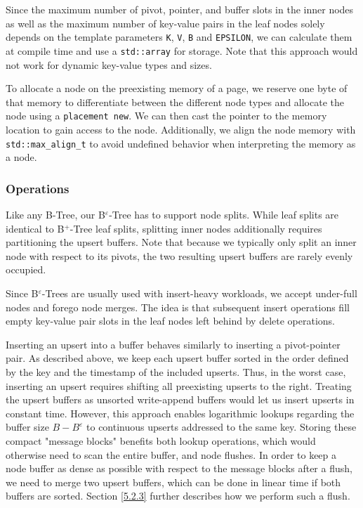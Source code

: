 Since the maximum number of pivot, pointer, and buffer slots in the inner nodes as well as the maximum number of key-value pairs in the leaf nodes solely depends on the template parameters \texttt{K}, \texttt{V}, \texttt{B} and \texttt{EPSILON}, we can calculate them at compile time and use a \texttt{std::array} for storage. Note that this approach would not work for dynamic key-value types and sizes.

To allocate a node on the preexisting memory of a page, we reserve one byte of that memory to differentiate between the different node types and allocate the node using a \texttt{placement new}. We can then cast the pointer to the memory location to gain access to the node. Additionally, we align the node memory with \texttt{std::max\_align\_t} to avoid undefined behavior when interpreting the memory as a node. 

\subsubsection{Operations}

Like any B-Tree, our B$^\varepsilon$-Tree has to support node splits. While leaf splits are identical to B$^+$-Tree leaf splits, splitting inner nodes additionally requires partitioning the upsert buffers. Note that because we typically only split an inner node with respect to its pivots, the two resulting upsert buffers are rarely evenly occupied.

Since B$^\varepsilon$-Trees are usually used with insert-heavy workloads, we accept under-full nodes and forego node merges. The idea is that subsequent insert operations fill empty key-value pair slots in the leaf nodes left behind by delete operations.

Inserting an upsert into a buffer behaves similarly to inserting a pivot-pointer pair. As described above, we keep each upsert buffer sorted in the order defined by the key and the timestamp of the included upserts. Thus, in the worst case, inserting an upsert requires shifting all preexisting upserts to the right. Treating the upsert buffers as unsorted write-append buffers would let us insert upserts in constant time. However, this approach enables logarithmic lookups regarding the buffer size $B-B^\varepsilon$ to continuous upserts addressed to the same key. Storing these compact "message blocks" benefits both lookup operations, which would otherwise need to scan the entire buffer, and node flushes. In order to keep a node buffer as dense as possible with respect to the message blocks after a flush, we need to merge two upsert buffers, which can be done in linear time if both buffers are sorted. Section \ref{5.2.3} further describes how we perform such a flush.

